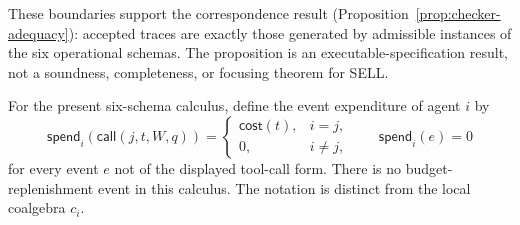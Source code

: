 \documentclass[a4paper,fleqn]{cas-sc}
\newcommand{\cost}{\mathsf{cost}}
\begin{document}
These boundaries support the correspondence result
(Proposition~\ref{prop:checker-adequacy}): accepted traces are exactly those
generated by admissible instances of the six operational schemas. The
proposition is an executable-specification result, not a soundness,
completeness, or focusing theorem for SELL.

For the present six-schema calculus, define the event expenditure of agent
\(i\) by
\[
  \mathsf{spend}_i(\mathsf{call}(j,t,W,q))=
  \begin{cases}
    \cost(t),&i=j,\\
    0,&i\ne j,
  \end{cases}
  \qquad
  \mathsf{spend}_i(e)=0
\]
for every event \(e\) not of the displayed tool-call form. There is no budget-replenishment event in this
calculus. The notation is distinct from the local coalgebra \(c_i\).
\end{document}
